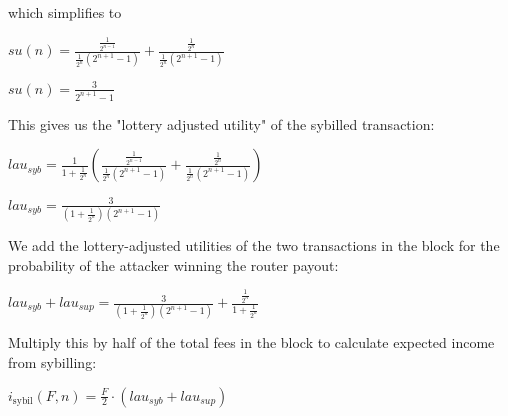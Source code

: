 \documentclass[oneside]{article}   	%
\begin{document}
\begin{multicols}{2}
which simplifies to

\large
\begin{adjustwidth}{1.5em}{1.5em} 
	\begin{math}
su(n) =\frac{\frac{1}{2^{n - 1}}}{\frac{1}{2^n} \left(2^{n + 1} - 1 \right)} + \frac{\frac{1}{2^n}}{\frac{1}{2^n} \left(2^{n + 1} - 1 \right)}
	\end{math}

	\begin{math}
su(n) = \frac{3}{2^{n+1} - 1}
	\end{math}
\end{adjustwidth}
\normalsize

This gives us the "lottery adjusted utility" of the sybilled transaction:

\large
\begin{adjustwidth}{1.5em}{1.5em} 
	\begin{math}
lau_{syb} = \frac{1}{1+\frac{1}{2^n}} \left(\frac{\frac{1}{2^{n-1}}}{\frac{1}{2^n} \left(2^{n+1}-1\right)} + \frac{\frac{1}{2^n}}{\frac{1}{2^n} \left(2^{n+1}-1\right)}\right)
	\end{math}

	\begin{math}
lau_{syb} = \frac{3}{\left(1 + \frac{1}{2^{n}}\right)\left(2^{n+1}-1\right)}
	\end{math}
\end{adjustwidth}
\normalsize

We add the lottery-adjusted utilities of the two transactions in the block for the probability of the attacker winning the router payout:

\large
\begin{adjustwidth}{1.5em}{1.5em} 
	\begin{math}
lau_{syb} + lau_{sup} = \frac{3}{\left(1+\frac{1}{2^n}\right)\left(2^{n+1}-1\right)}+\frac{\frac{1}{2^n}}{1+\frac{1}{2^n}}
	\end{math}
\end{adjustwidth}
\normalsize

Multiply this by half of the total fees in the block to calculate expected income from sybilling:

\large
\begin{adjustwidth}{1.5em}{1.5em} 
	\begin{math}
i_{\text{sybil}}(F, n) = \frac{F}{2} \cdot \left(lau_{syb} + lau_{sup}\right)
	\end{math}
\end{adjustwidth}
\normalsize


\end{multicols}
\end{document}
